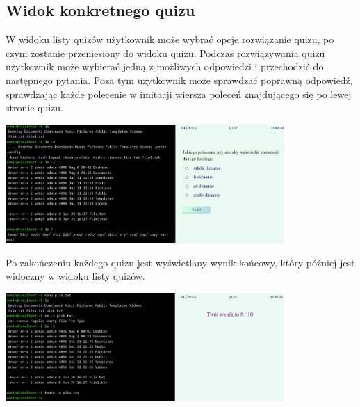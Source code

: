 \documentclass[10pt,a4paper]{report}
\begin{document}
\begin{adjustwidth}{2cm}{2cm}
\subsection{Widok konkretnego quizu}
\begin{minipage}{1\linewidth}
W widoku listy quizów użytkownik może wybrać opcje rozwiązanie quizu, po czym zostanie przeniesiony do widoku quizu. Podczas rozwiązywania quizu użytkownik może wybierać jedną z możliwych odpowiedzi i przechodzić do następnego pytania. Poza tym użytkownik może sprawdzać poprawną odpowiedź, sprawdzając każde polecenie w imitacji wiersza poleceń znajdującego się po lewej stronie quizu. \\
\end{minipage}
\begin{minipage}{\linewidth}
\begin{center}
  \includegraphics[width=400px]{project/quiz1.png}
\end{center}
\end{minipage}
\begin{minipage}{1\linewidth}
\vspace{0.3cm}
 Po zakończeniu każdego quizu jest wyświetlany wynik końcowy, który później jest widoczny w widoku listy quizów. \\
 \end{minipage}
\begin{minipage}{\linewidth}
\begin{center}
  \includegraphics[width=400px]{project/quiz2.png}

\end{center}
\end{minipage}
\end{adjustwidth}
\end{document}
